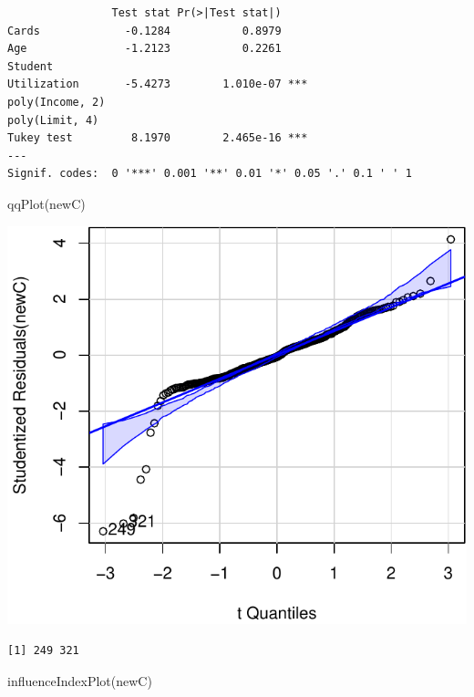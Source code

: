 \documentclass[
]{article}
\newenvironment{Shaded}{\begin{snugshade}}{\end{snugshade}}
\newcommand{\FunctionTok}[1]{\textcolor[rgb]{0.00,0.00,0.00}{#1}}
\newcommand{\NormalTok}[1]{#1}
\begin{document}
\begin{verbatim}
                Test stat Pr(>|Test stat|)    
Cards             -0.1284           0.8979    
Age               -1.2123           0.2261    
Student                                       
Utilization       -5.4273        1.010e-07 ***
poly(Income, 2)                               
poly(Limit, 4)                                
Tukey test         8.1970        2.465e-16 ***
---
Signif. codes:  0 '***' 0.001 '**' 0.01 '*' 0.05 '.' 0.1 ' ' 1
\end{verbatim}

\begin{Shaded}
\begin{Highlighting}[]
\FunctionTok{qqPlot}\NormalTok{(newC)}
\end{Highlighting}
\end{Shaded}

\begin{center}\includegraphics{SDM-CHAP24_files/figure-latex/unnamed-chunk-4-2} \end{center}

\begin{verbatim}
[1] 249 321
\end{verbatim}

\begin{Shaded}
\begin{Highlighting}[]
\FunctionTok{influenceIndexPlot}\NormalTok{(newC)}
\end{Highlighting}
\end{Shaded}
\end{document}
